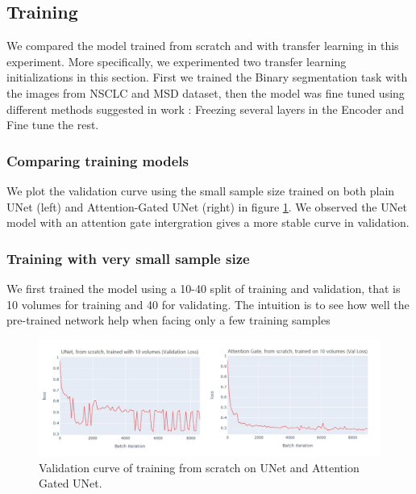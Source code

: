 \newpage
\subsection{Training}
We compared the model trained from scratch and with transfer learning in this experiment. More specifically, we experimented two transfer learning initializations in this section. First we trained the Binary segmentation task with the images from NSCLC and MSD dataset, then the model was fine tuned using different methods suggested in work \cite{wang_improving_2019}: Freezing several layers in the Encoder and Fine tune the rest.

\subsubsection{Comparing training models}
We plot the validation curve using the small sample size trained on both plain UNet (left) and Attention-Gated UNet (right) in figure \ref{fig:unetvsatt}. We observed the UNet model with an attention gate intergration gives a more stable curve in validation.

\subsubsection{Training with very small sample size}
We first trained the model using a 10-40 split of training and validation, that is 10 volumes for training and 40 for validating. The intuition is to see how well the pre-trained network help when facing only a few training samples\\

\begin{figure}[h]
	\centering
	\includegraphics[width=\textwidth]{img/experiment/UnetvsAtt_fromscrath.png}
	\caption{Validation curve of training from scratch on UNet and Attention Gated UNet.}
	\label{fig:unetvsatt}
\end{figure}

